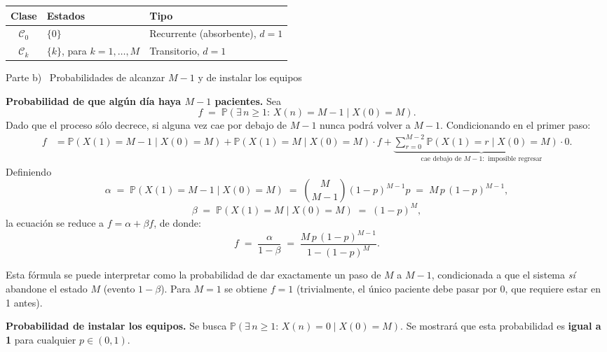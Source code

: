 \documentclass[10pt,a4paper]{article}
\newcommand{\Prob}[1]{\mathbb{P}\!\left(#1\right)}
\newcommand{\parteheader}[1]{%
  \vspace{8pt}\needspace{4cm}\noindent
  \begin{tcolorbox}[
    colback=subsecbg!18, colframe=subsecbg!55,
    sharp corners, boxrule=0.4pt,
    left=6pt, right=6pt, top=3pt, bottom=3pt,
    fontupper=\small\bfseries\sffamily,
  ]
  #1
  \end{tcolorbox}\vspace{2pt}%
}
\newenvironment{nota}{\begin{tcolorbox}[notebox]}{\end{tcolorbox}}
\begin{document}
\begin{center}
  \begin{tabular}{cll}
    \toprule
    Clase           & Estados                      & Tipo                           \\
    \midrule
    $\mathcal{C}_0$ & $\{0\}$                      & Recurrente (absorbente), $d=1$ \\
    $\mathcal{C}_k$ & $\{k\}$, para $k=1,\ldots,M$ & Transitorio, $d=1$             \\
    \bottomrule
  \end{tabular}
\end{center}

\parteheader{Parte b) \textperiodcentered\ Probabilidades de alcanzar $M{-}1$ y de instalar los equipos}

\textbf{Probabilidad de que alg\'un d\'ia haya $M-1$ pacientes.}\quad
Sea
\[
  f \;=\; \Prob{\exists\,n\ge 1:\,X(n)=M-1 \mid X(0)=M}.
\]
Dado que el proceso s\'olo decrece, si alguna vez cae por debajo de $M-1$ nunca
podr\'a volver a $M-1$. Condicionando en el primer paso:
\begin{align*}
  f & = \Prob{X(1)=M-1\mid X(0)=M}
  + \Prob{X(1)=M\mid X(0)=M}\cdot f
  + \underbrace{\sum_{r=0}^{M-2}\Prob{X(1)=r\mid X(0)=M}\cdot 0}_{\text{cae debajo de }M-1:\text{ imposible regresar}}.
\end{align*}
Definiendo
\[
  \alpha \;=\; \Prob{X(1)=M-1\mid X(0)=M}
  \;=\; \binom{M}{M-1}(1-p)^{M-1}p
  \;=\; M\,p\,(1-p)^{M-1},
\]
\[
  \beta  \;=\; \Prob{X(1)=M\mid X(0)=M}
  \;=\; (1-p)^M,
\]
la ecuaci\'on se reduce a $f = \alpha + \beta f$, de donde:
\[
  \boxed{f \;=\; \frac{\alpha}{1-\beta}
    \;=\; \frac{M\,p\,(1-p)^{M-1}}{1-(1-p)^M}.}
\]

\begin{nota}
  Esta f\'ormula se puede interpretar como la probabilidad de dar exactamente un paso
  de $M$ a $M-1$, condicionada a que el sistema \emph{s\'i} abandone el estado $M$
  (evento $1-\beta$). Para $M=1$ se obtiene $f=1$ (trivialmente, el \'unico paciente
  debe pasar por 0, que requiere estar en 1 antes).
\end{nota}

\medskip
\textbf{Probabilidad de instalar los equipos.}\quad
Se busca $\Prob{\exists\,n\ge 1:\,X(n)=0 \mid X(0)=M}$. Se mostrar\'a que esta
probabilidad es \textbf{igual a 1} para cualquier $p\in(0,1)$.
\end{document}
